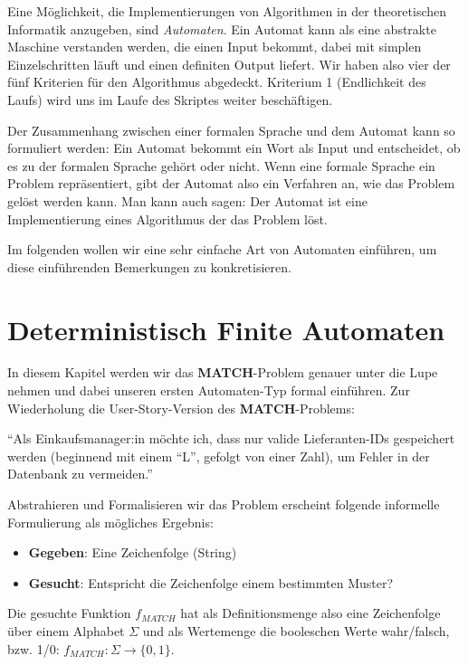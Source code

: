 Eine Möglichkeit,
die Implementierungen von Algorithmen in der theoretischen Informatik
anzugeben, sind \emph{Automaten}.
Ein Automat kann als eine abstrakte Maschine verstanden werden,
die einen Input bekommt, 
dabei mit simplen Einzelschritten läuft
und einen definiten Output liefert.
Wir haben also vier der fünf Kriterien für den Algorithmus abgedeckt.
Kriterium 1 (Endlichkeit des Laufs) wird uns im Laufe des Skriptes weiter beschäftigen.

Der Zusammenhang zwischen einer formalen Sprache und dem Automat kann so formuliert werden:
Ein Automat bekommt ein Wort als Input und entscheidet,
ob es zu der formalen Sprache gehört oder nicht.
Wenn eine formale Sprache ein Problem repräsentiert,
gibt der Automat also ein Verfahren an, 
wie das Problem gelöst werden kann.
Man kann auch sagen:
Der Automat ist eine Implementierung eines Algorithmus der das Problem löst.

Im folgenden wollen wir eine sehr einfache Art von Automaten einführen,
um diese einführenden Bemerkungen zu konkretisieren.

\section{Deterministisch Finite Automaten}
In diesem Kapitel werden wir das \textbf{MATCH}-Problem genauer unter die Lupe nehmen
und dabei unseren ersten Automaten-Typ formal einführen.
Zur Wiederholung die User-Story-Version des \textbf{MATCH}-Problems:
\begin{center}
``Als Einkaufsmanager:in möchte ich, dass nur valide Lieferanten-IDs gespeichert werden
(beginnend mit einem ``L'', gefolgt von einer Zahl),
um Fehler in der Datenbank zu vermeiden.''
\end{center}
Abstrahieren und Formalisieren wir das Problem erscheint folgende informelle Formulierung
als mögliches Ergebnis:
\begin{itemize}
\item \textbf{Gegeben}: Eine Zeichenfolge (String)
\item \textbf{Gesucht}: Entspricht die Zeichenfolge einem bestimmten Muster?
\end{itemize}
Die gesuchte Funktion $f_{MATCH}$ hat als Definitionsmenge also eine Zeichenfolge
über einem Alphabet $\Sigma$ und als Wertemenge die booleschen Werte wahr/falsch,
bzw. 1/0: $f_{MATCH}: \Sigma \rightarrow \{0,1\}$.

